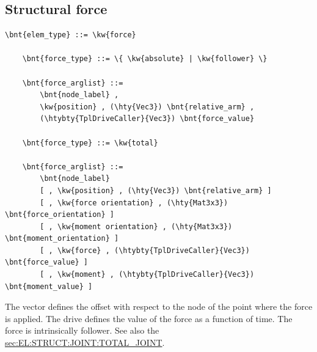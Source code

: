 \subsection{Structural force}
\label{sec:EL:FORCE:STRUCTURAL:FORCE}
\begin{Verbatim}[commandchars=\\\{\}]
    \bnt{elem_type} ::= \kw{force}

    \bnt{force_type} ::= \{ \kw{absolute} | \kw{follower} \} 

    \bnt{force_arglist} ::=
        \bnt{node_label} , 
        \kw{position} , (\hty{Vec3}) \bnt{relative_arm} ,
        (\htybty{TplDriveCaller}{Vec3}) \bnt{force_value}

    \bnt{force_type} ::= \kw{total}

    \bnt{force_arglist} ::=
        \bnt{node_label}
        [ , \kw{position} , (\hty{Vec3}) \bnt{relative_arm} ]
        [ , \kw{force orientation} , (\hty{Mat3x3}) \bnt{force_orientation} ]
        [ , \kw{moment orientation} , (\hty{Mat3x3}) \bnt{moment_orientation} ]
        [ , \kw{force} , (\htybty{TplDriveCaller}{Vec3}) \bnt{force_value} ]
        [ , \kw{moment} , (\htybty{TplDriveCaller}{Vec3}) \bnt{moment_value} ]
\end{Verbatim}
The vector  defines the offset with respect
to the node of the point where the force is applied.
The drive  defines the value of the force
as a function of time.
The  force is intrinsically follower.
See also the 
\hyperref{\kw{total joint}}{\kw{total joint} (Section~}{)}{sec:EL:STRUCT:JOINT:TOTAL_JOINT}.

